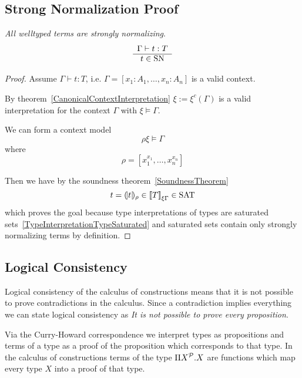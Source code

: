 \subsection{Strong Normalization Proof}


\begin{theorem}
    \label{StrongNormalizationProof}
    \emph{All welltyped terms are strongly normalizing}.
    $$
    \begin{array}{c} 
        \Gamma \vdash t : T
     \\ \hline 
        t \in \text{SN}
    \end{array}
    $$


    \begin{proof}
        Assume $\Gamma \vdash t : T$, i.e. $\Gamma = [x_1 : A_1, \ldots, x_n :
        A_n]$ is a valid context.

        By theorem~\ref{CanonicalContextInterpretation} $\xi := \xi^c(\Gamma)$ is
        a valid interpretation for the context $\Gamma$ with $\xi \vDash
        \Gamma$.

        We can form a context model
        $$
        \rho\xi \vDash \Gamma
        $$
        where
        $$
        \rho = [x_1^{x_1}, \ldots, x_n^{x_n}]
        $$

        Then we have by the soundness theorem~\ref{SoundnessTheorem}
        $$
        t = {(\!|t|\!)_{\rho}} \in {{{[\![}T {]\!]}}_{\xi\Gamma}} \in \text{SAT}
        $$
        which proves the goal because type interpretations of types are
        saturated sets~\ref{TypeInterpretationTypeSaturated} and saturated sets
        contain only strongly normalizing terms by definition.
    \end{proof}
\end{theorem}




\subsection{Logical Consistency}

Logical consistency of the calculus of constructions means that it is not
possible to prove contradictions in the calculus. Since a contradiction implies
everything we can state logical consistency as \emph{It is not possible to prove
every proposition}.

Via the Curry-Howard correspondence we interpret types as propositions and terms
of a type as a proof of the proposition which corresponds to that type. In the
calculus of constructions terms of the type $\Pi X^{\cal P}. X$ are functions which
map every type $X$ into a proof of that type.

